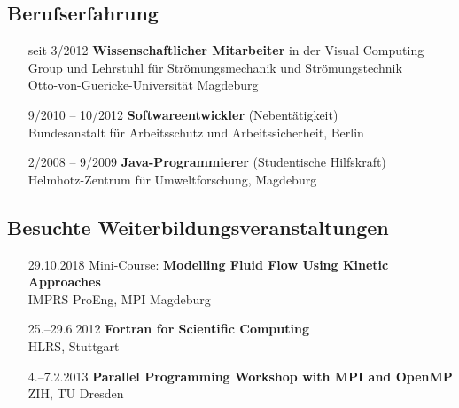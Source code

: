 \documentclass[oneside]{scrartcl}
\begin{document}
\subsection*{Berufserfahrung}
%
\begin{enumerate}
    \item[seit 3/2012] \textbf{Wissenschaftlicher Mitarbeiter} in der Visual
                       Computing Group und Lehrstuhl für
                       Strömungsmechanik und Strömungstechnik\\
                       Otto-von-Guericke-Universität Magdeburg
    \item[9/2010 -- 10/2012] \textbf{Softwareentwickler} (Nebentätigkeit)\\
                             Bundesanstalt für Arbeitsschutz und Arbeitssicherheit, Berlin
    \item[2/2008 -- 9/2009] \textbf{Java-Programmierer} (Studentische Hilfskraft)\\
                            Helmhotz-Zentrum für Umweltforschung, Magdeburg
\end{enumerate}
%
\subsection*{Besuchte Weiterbildungsveranstaltungen}
%
\begin{enumerate}
    \item[29.10.2018] Mini-Course: \textbf{Modelling Fluid Flow Using Kinetic Approaches}\\
                      IMPRS ProEng, MPI Magdeburg
    \item[25.--29.6.2012] \textbf{Fortran for Scientific Computing}\\
                          HLRS, Stuttgart
    \item[4.--7.2.2013] \textbf{Parallel Programming Workshop with MPI and OpenMP}\\
                  ZIH, TU Dresden
\end{enumerate}
\end{document}
